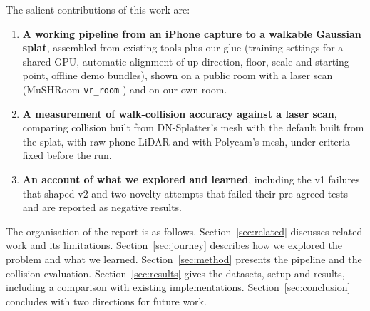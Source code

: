 The salient contributions of this work are:
\begin{enumerate}
    \item \textbf{A working pipeline from an iPhone capture to a walkable Gaussian splat}, assembled from existing tools plus our glue (training settings for a shared GPU, automatic alignment of up direction, floor, scale and starting point, offline demo bundles), shown on a public room with a laser scan (MuSHRoom \texttt{vr\_room} \cite{ren2024mushroom}) and on our own room.
    \item \textbf{A measurement of walk-collision accuracy against a laser scan}, comparing collision built from DN-Splatter's mesh with the default built from the splat, with raw phone LiDAR and with Polycam's mesh, under criteria fixed before the run.
    \item \textbf{An account of what we explored and learned}, including the v1 failures that shaped v2 and two novelty attempts that failed their pre-agreed tests and are reported as negative results.
\end{enumerate}

The organisation of the report is as follows. Section~\ref{sec:related} discusses related work and its limitations. Section~\ref{sec:journey} describes how we explored the problem and what we learned. Section~\ref{sec:method} presents the pipeline and the collision evaluation. Section~\ref{sec:results} gives the datasets, setup and results, including a comparison with existing implementations. Section~\ref{sec:conclusion} concludes with two directions for future work.
